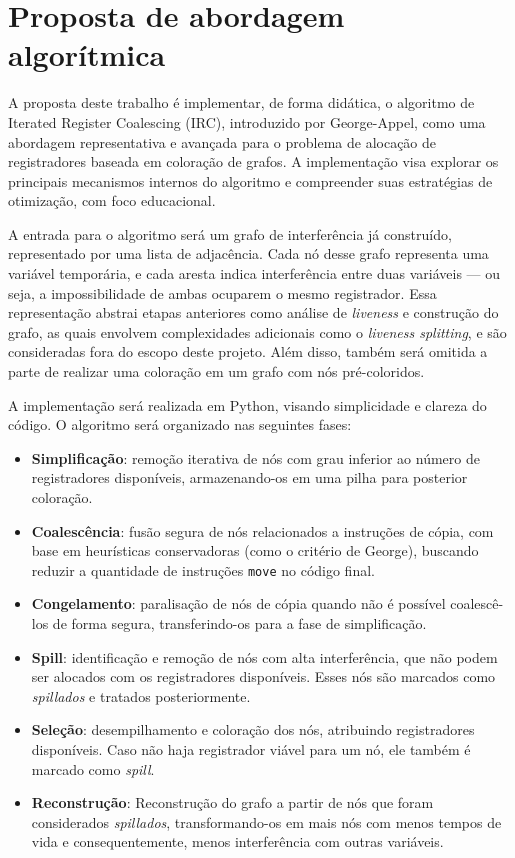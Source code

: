 \section{Proposta de abordagem algorítmica}

A proposta deste trabalho é implementar, de forma didática, o algoritmo de Iterated Register Coalescing (IRC),
introduzido por George-Appel, como uma abordagem representativa e avançada para o problema de alocação de registradores
baseada em coloração de grafos. A implementação visa explorar os principais mecanismos internos do algoritmo e compreender
suas estratégias de otimização, com foco educacional.

A entrada para o algoritmo será um grafo de interferência já construído, representado por uma lista de adjacência. Cada nó
desse grafo representa uma variável temporária, e cada aresta indica interferência entre duas variáveis — ou seja, a impossibilidade
de ambas ocuparem o mesmo registrador. Essa representação abstrai etapas anteriores como análise de \textit{liveness} e
construção do grafo, as quais envolvem complexidades adicionais como o \textit{liveness splitting}, e são consideradas
fora do escopo deste projeto. Além disso, também será omitida a parte de realizar uma coloração em um grafo com nós pré-coloridos.

A implementação será realizada em Python, visando simplicidade e clareza do código. O algoritmo será organizado
nas seguintes fases:

\begin{itemize}
  \item \textbf{Simplificação}: remoção iterativa de nós com grau inferior ao número de registradores disponíveis,
    armazenando-os em uma pilha para posterior coloração.
  \item \textbf{Coalescência}: fusão segura de nós relacionados a instruções de cópia, com base em heurísticas conservadoras
    (como o critério de George), buscando reduzir a quantidade de instruções \texttt{move} no código final.
  \item \textbf{Congelamento}: paralisação de nós de cópia quando não é possível coalescê-los de forma segura, transferindo-os
    para a fase de simplificação.
  \item \textbf{Spill}: identificação e remoção de nós com alta interferência, que não podem ser alocados com os registradores
    disponíveis. Esses nós são marcados como \textit{spillados} e tratados posteriormente.
  \item \textbf{Seleção}: desempilhamento e coloração dos nós, atribuindo registradores disponíveis. Caso não haja registrador
    viável para um nó, ele também é marcado como \textit{spill}.
  \item \textbf{Reconstrução}: Reconstrução do grafo a partir de nós que foram considerados \textit{spillados}, transformando-os
    em mais nós com menos tempos de vida e consequentemente, menos interferência com outras variáveis. 
\end{itemize}

